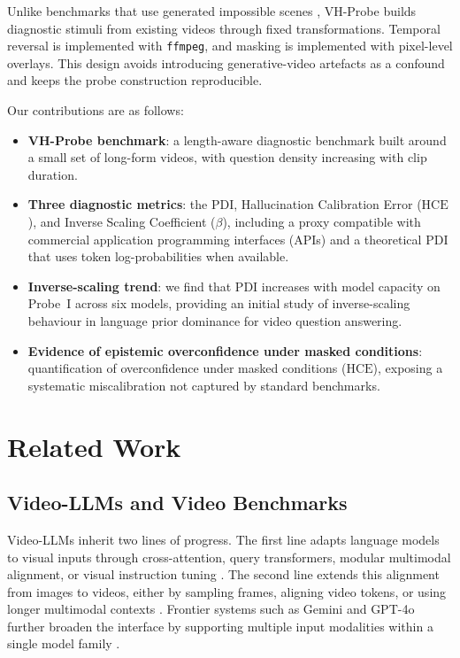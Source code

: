 \documentclass[final,5p,times,twocolumn]{elsarticle}
\newcommand{\PDI}{\mathrm{PDI}}
\newcommand{\HCE}{\mathrm{HCE}}
\begin{document}
Unlike benchmarks that use generated impossible scenes
\cite{bai2025impossible}, VH-Probe builds diagnostic stimuli from
existing videos through fixed transformations. Temporal reversal is implemented
with \texttt{ffmpeg}, and masking is implemented with pixel-level overlays.
This design avoids introducing generative-video artefacts as a confound and
keeps the probe construction reproducible.

Our contributions are as follows:
\begin{itemize}
\item \textbf{VH-Probe benchmark}: a length-aware diagnostic benchmark built around a small set of long-form videos, with question density increasing with clip duration.
  
\item \textbf{Three diagnostic metrics}: the $\PDI$, Hallucination Calibration
Error ($\HCE$), and Inverse Scaling Coefficient ($\beta$), including a proxy
compatible with commercial application programming interfaces (APIs) and a
theoretical $\PDI$ that uses token log-probabilities when available.
 
\item \textbf{Inverse-scaling trend}: we find that $\PDI$ increases with model capacity on Probe~I across six models, providing an initial study of inverse-scaling behaviour in language prior dominance for video question answering.


 
\item \textbf{Evidence of epistemic overconfidence under masked conditions}: quantification of overconfidence under masked conditions ($\HCE$), exposing a systematic miscalibration not captured by standard benchmarks.
\end{itemize}

\section{Related Work}
\label{sec:related}
\subsection{Video-LLMs and Video Benchmarks}

Video-LLMs inherit two lines of progress. The first line adapts language models
to visual inputs through cross-attention, query transformers, modular
multimodal alignment, or visual instruction tuning
\cite{alayrac2022flamingo,li2023blip,dai2023instructblip,zhu2024minigpt,liu2023visual,ye2023mplug}.
The second line extends this alignment from images to videos, either by
sampling frames, aligning video tokens, or using longer multimodal contexts
\cite{maaz2024video,zhang2023video,li2025videochat,lin2024video,wang2024qwen2,chen2024internvl}.
Frontier systems such as Gemini and GPT-4o further broaden the interface by
supporting multiple input modalities within a single model family
\cite{team2023gemini,team2024gemini,hurst2024gpt}.
\end{document}
